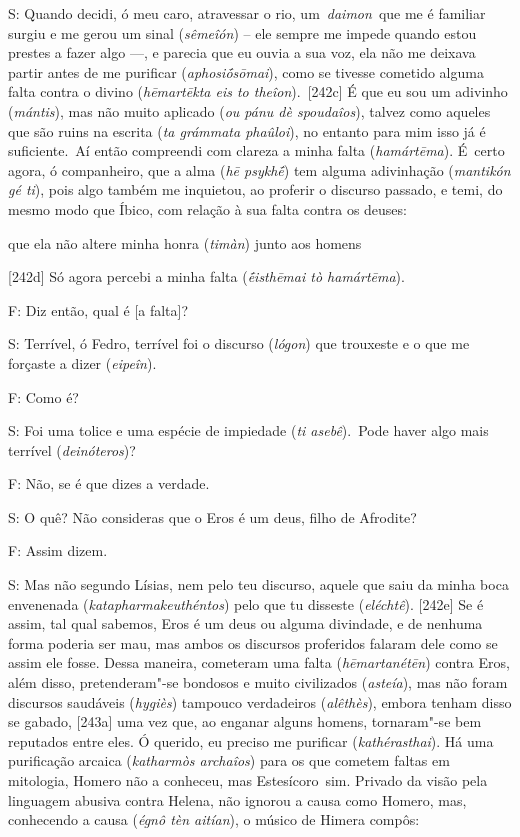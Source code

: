 S: Quando decidi, ó meu caro, atravessar o rio, um~\emph{daimon}~que me
é familiar surgiu e me gerou um sinal (\emph{sêmeîón}) -- ele sempre me
impede quando estou prestes a fazer algo \mbox{---,} e parecia que eu ouvia a
sua voz, ela não me deixava partir antes de me purificar
(\emph{aphosiṓsōmai}), como se tivesse cometido alguma falta contra o
divino (\emph{hēmartēkta eis to theîon}).~[242c] É que eu sou um
adivinho (\emph{mántis}), mas não muito aplicado (\emph{ou pánu dè
spoudaîos}), talvez como aqueles que são ruins na escrita (\emph{ta
grámmata phaûloi}), no entanto para mim isso já é suficiente.~Aí então
compreendi com clareza a minha falta (\emph{hamártēma}). É~certo agora,
ó companheiro, que a alma (\emph{hē psykhḗ}) tem alguma adivinhação
(\emph{mantikón gé ti}), pois algo também me inquietou, ao proferir o
discurso passado, e temi, do mesmo modo que Íbico, com relação à sua
falta contra os deuses:

 

que ela não altere minha honra (\emph{timàn}) junto aos homens

 

[242d] Só agora percebi a minha falta (\emph{ḗisthēmai tò
hamártēma}).

 

F: Diz então, qual é [a falta]?

 

S: Terrível, ó Fedro, terrível foi o discurso (\emph{lógon}) que
trouxeste e o que me forçaste a dizer (\emph{eipeîn}).

 

F: Como é?

 

S: Foi uma tolice e uma espécie de impiedade (\emph{ti asebê}).~Pode
haver algo mais terrível (\emph{deinóteros})?

 

F: Não, se é que dizes a verdade.

 

S: O quê? Não consideras que o Eros é um deus, filho de Afrodite?

 

F: Assim dizem.

 

S: Mas não segundo Lísias, nem pelo teu discurso, aquele que saiu da
minha boca envenenada (\emph{katapharmakeuthéntos}) pelo que tu disseste
(\emph{eléchtê}). [242e] Se é assim, tal qual sabemos, Eros é um
deus ou alguma divindade, e de nenhuma forma poderia ser mau, mas ambos
os discursos proferidos falaram dele como se assim ele fosse. Dessa
maneira, cometeram uma falta (\emph{hēmartanétēn}) contra Eros, além
disso, pretenderam"-se bondosos e muito civilizados (\emph{asteía}), mas
não foram discursos saudáveis (\emph{hygiès}) tampouco verdadeiros
(\emph{alêthès}), embora tenham disso se gabado, [243a] uma vez que,
ao enganar alguns homens, tornaram"-se bem reputados entre eles. Ó
querido, eu preciso me purificar (\emph{kathérasthai}). Há uma
purificação arcaica (\emph{katharmòs archaîos}) para os que cometem
faltas em mitologia, Homero não a conheceu, mas Estesícoro~sim. Privado
da visão pela linguagem abusiva contra Helena, não ignorou a causa como
Homero, mas, conhecendo a causa (\emph{égnô tèn aitían}), o músico de
Himera compôs:

